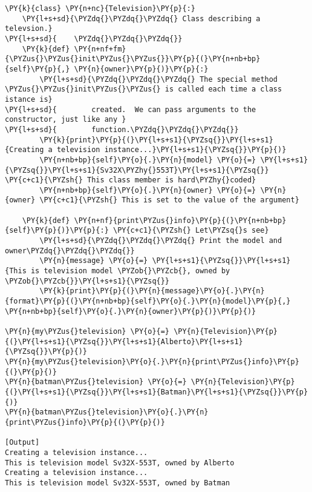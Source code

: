 \begin{Verbatim}[label=\makebox{\url{https://bitbucket.org/lbaldini/programming/src/tip/snippets/class\_constructor.py}},commandchars=\\\{\}]
\PY{k}{class} \PY{n+nc}{Television}\PY{p}{:}  
    \PY{l+s+sd}{\PYZdq{}\PYZdq{}\PYZdq{} Class describing a televsion.}
\PY{l+s+sd}{    \PYZdq{}\PYZdq{}\PYZdq{}}
    \PY{k}{def} \PY{n+nf+fm}{\PYZus{}\PYZus{}init\PYZus{}\PYZus{}}\PY{p}{(}\PY{n+nb+bp}{self}\PY{p}{,} \PY{n}{owner}\PY{p}{)}\PY{p}{:}
        \PY{l+s+sd}{\PYZdq{}\PYZdq{}\PYZdq{} The special method \PYZus{}\PYZus{}init\PYZus{}\PYZus{} is called each time a class istance is}
\PY{l+s+sd}{        created.  We can pass arguments to the constructor, just like any }
\PY{l+s+sd}{        function.\PYZdq{}\PYZdq{}\PYZdq{}}
        \PY{k}{print}\PY{p}{(}\PY{l+s+s1}{\PYZsq{}}\PY{l+s+s1}{Creating a television instance...}\PY{l+s+s1}{\PYZsq{}}\PY{p}{)}
        \PY{n+nb+bp}{self}\PY{o}{.}\PY{n}{model} \PY{o}{=} \PY{l+s+s1}{\PYZsq{}}\PY{l+s+s1}{Sv32X\PYZhy{}553T}\PY{l+s+s1}{\PYZsq{}} \PY{c+c1}{\PYZsh{} This class member is hard\PYZhy{}coded}
        \PY{n+nb+bp}{self}\PY{o}{.}\PY{n}{owner} \PY{o}{=} \PY{n}{owner} \PY{c+c1}{\PYZsh{} This is set to the value of the argument}
    
    \PY{k}{def} \PY{n+nf}{print\PYZus{}info}\PY{p}{(}\PY{n+nb+bp}{self}\PY{p}{)}\PY{p}{:} \PY{c+c1}{\PYZsh{} Let\PYZsq{}s see}
        \PY{l+s+sd}{\PYZdq{}\PYZdq{}\PYZdq{} Print the model and owner\PYZdq{}\PYZdq{}\PYZdq{}}
        \PY{n}{message} \PY{o}{=} \PY{l+s+s1}{\PYZsq{}}\PY{l+s+s1}{This is television model \PYZob{}\PYZcb{}, owned by \PYZob{}\PYZcb{}}\PY{l+s+s1}{\PYZsq{}}
        \PY{k}{print}\PY{p}{(}\PY{n}{message}\PY{o}{.}\PY{n}{format}\PY{p}{(}\PY{n+nb+bp}{self}\PY{o}{.}\PY{n}{model}\PY{p}{,} \PY{n+nb+bp}{self}\PY{o}{.}\PY{n}{owner}\PY{p}{)}\PY{p}{)}

\PY{n}{my\PYZus{}television} \PY{o}{=} \PY{n}{Television}\PY{p}{(}\PY{l+s+s1}{\PYZsq{}}\PY{l+s+s1}{Alberto}\PY{l+s+s1}{\PYZsq{}}\PY{p}{)}
\PY{n}{my\PYZus{}television}\PY{o}{.}\PY{n}{print\PYZus{}info}\PY{p}{(}\PY{p}{)}
\PY{n}{batman\PYZus{}television} \PY{o}{=} \PY{n}{Television}\PY{p}{(}\PY{l+s+s1}{\PYZsq{}}\PY{l+s+s1}{Batman}\PY{l+s+s1}{\PYZsq{}}\PY{p}{)}
\PY{n}{batman\PYZus{}television}\PY{o}{.}\PY{n}{print\PYZus{}info}\PY{p}{(}\PY{p}{)}

[Output]
Creating a television instance...
This is television model Sv32X-553T, owned by Alberto
Creating a television instance...
This is television model Sv32X-553T, owned by Batman
\end{Verbatim}